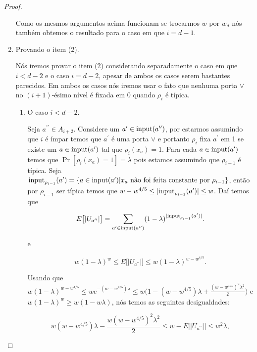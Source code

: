 \begin{proof}
\begin{enumerate}
    Como os mesmos argumentos acima funcionam se trocarmos $w$ por $w_{d}$ nós também obtemos o resultado para o caso em que $i = d - 1$.

	\item Provando o item (2).
	
	Nós iremos provar o item (2) considerando separadamente o caso em que $i < d - 2$ e o caso $i = d - 2$, apesar de ambos os casos serem bastantes parecidos. Em ambos os casos nós iremos usar o fato que nenhuma porta $\lor$ no $(i + 1)$-ésimo nível é fixada em 0 quando $\rho_{i}$ é típica.
	
	\begin{enumerate}
	
		\item O caso $i < d - 2$.
	
		Seja $a^{\prime \prime} \in A_{i + 2}$. Considere um $a^{\prime} \in \text{input}(a^{\prime \prime})$, por estarmos assumindo que $i$ é ímpar temos que $a^{\prime}$ é uma porta $\lor$ e portanto $\rho_{i}$ fixa $a^{\prime}$ em 1 se existe um $a \in \text{input}(a^{\prime})$ tal que $\rho_{i}(x_{a}) = 1$. Para cada $a \in \text{input}(a^{\prime})$ temos que $\Pr[\rho_{i}(x_{a}) = 1] = \lambda$ pois estamos assumindo que $\rho_{i - 1}$ é típica. Seja $\text{input}_{\rho_{i - 1}}(a^{\prime}) = \{ a \in \text{input}(a^{\prime}) \lvert x_{a} \text{ não foi feita constante por } \rho_{i - 1}\}$, então por $\rho_{i - 1}$ ser típica temos que $w - w^{4/5} \leq \lvert \text{input}_{\rho_{i - 1}}(a^{\prime}) \rvert \leq w$. Daí temos que
		
		\begin{equation*}
			E \big[ \lvert U_{a^{\prime \prime}} \rvert \big] = \sum_{a^{\prime} \in \text{input}(a^{\prime \prime})} (1 - \lambda)^{\lvert \text{input}_{\rho_{i - 1}}(a^{\prime}) \rvert}.
		\end{equation*}
		
		e
		
		\begin{equation*}
		    w(1 - \lambda)^{w} \leq E \big[ \lvert U_{a^{\prime \prime}} \rvert \big] \leq w(1- \lambda)^{w - w^{4/5}}.
		\end{equation*}
		
		Usando que $w(1 - \lambda)^{w - w^{4/5}} \leq we^{-(w- w^{4/5})\lambda} \leq w \big( 1 - (w - w^{4/5})\lambda + \frac{(w - w^{4/5})^{2}\lambda^{2}}{2} \big)$ e $w(1 - \lambda)^{w} \geq w(1 - w\lambda)$, nós temos as seguintes desigualdades:
		
		\begin{equation*}
			w(w - w^{4/5})\lambda - \frac{w(w - w^{4/5})^{2}\lambda^{2}}{2} \leq w - E \big[ \lvert U_{a^{\prime \prime}} \rvert \big] \leq w^{2}\lambda,
		\end{equation*}


\end{enumerate}
\end{enumerate}
\end{proof}

